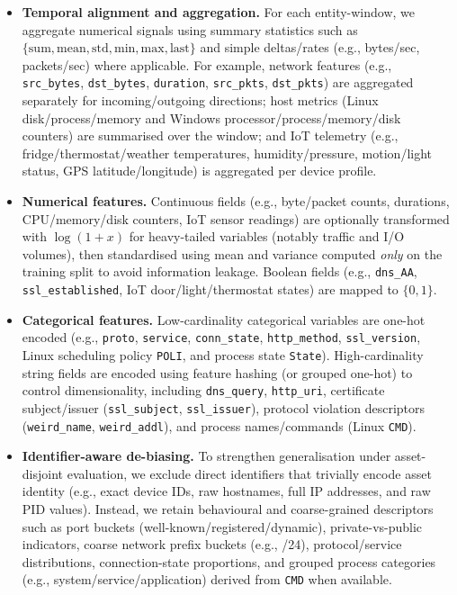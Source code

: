 \documentclass[pdflatex,sn-mathphys-num]{sn-jnl}
\theoremstyle{thmstyleone}%
\theoremstyle{thmstyletwo}%
\theoremstyle{thmstylethree}%
\begin{document}
\begin{itemize}
    \item \textbf{Temporal alignment and aggregation.} For each entity-window, we aggregate numerical signals using summary statistics such as $\{\mathrm{sum},\mathrm{mean},\mathrm{std},\mathrm{min},\mathrm{max},\mathrm{last}\}$ and simple deltas/rates (e.g., bytes/sec, packets/sec) where applicable. For example, network features (e.g., \texttt{src\_bytes}, \texttt{dst\_bytes}, \texttt{duration}, \texttt{src\_pkts}, \texttt{dst\_pkts}) are aggregated separately for incoming/outgoing directions; host metrics (Linux disk/process/memory and Windows processor/process/memory/disk counters) are summarised over the window; and IoT telemetry (e.g., fridge/thermostat/weather temperatures, humidity/pressure, motion/light status, GPS latitude/longitude) is aggregated per device profile.
    
    \item \textbf{Numerical features.} Continuous fields (e.g., byte/packet counts, durations, CPU/memory/disk counters, IoT sensor readings) are optionally transformed with $\log(1+x)$ for heavy-tailed variables (notably traffic and I/O volumes), then standardised using mean and variance computed \emph{only} on the training split to avoid information leakage. Boolean fields (e.g., \texttt{dns\_AA}, \texttt{ssl\_established}, IoT door/light/thermostat states) are mapped to $\{0,1\}$.

    \item \textbf{Categorical features.} Low-cardinality categorical variables are one-hot encoded (e.g., \texttt{proto}, \texttt{service}, \texttt{conn\_state}, \texttt{http\_method}, \texttt{ssl\_version}, Linux scheduling policy \texttt{POLI}, and process state \texttt{State}). High-cardinality string fields are encoded using feature hashing (or grouped one-hot) to control dimensionality, including \texttt{dns\_query}, \texttt{http\_uri}, certificate subject/issuer (\texttt{ssl\_subject}, \texttt{ssl\_issuer}), protocol violation descriptors (\texttt{weird\_name}, \texttt{weird\_addl}), and process names/commands (Linux \texttt{CMD}).

    \item \textbf{Identifier-aware de-biasing.} To strengthen generalisation under asset-disjoint evaluation, we exclude direct identifiers that trivially encode asset identity (e.g., exact device IDs, raw hostnames, full IP addresses, and raw PID values). Instead, we retain behavioural and coarse-grained descriptors such as port buckets (well-known/registered/dynamic), private-vs-public indicators, coarse network prefix buckets (e.g., /24), protocol/service distributions, connection-state proportions, and grouped process categories (e.g., system/service/application) derived from \texttt{CMD} when available.


\end{itemize}
\end{document}
